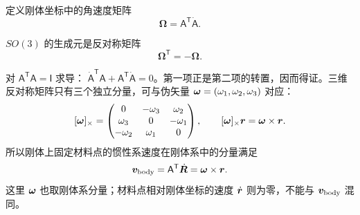 定义刚体坐标中的角速度矩阵
\begin{equation}\label{advA1:eq:omega-matrix}
 \bm{\Omega}=\mathsf{A}^{\mathsf T}\dot{\mathsf{A}}.
\end{equation}

\begin{advtheorem}{$SO(3)$ 的生成元是反对称矩阵}\label{advA1:thm:so3-generator}
\[
 \bm{\Omega}^{\mathsf T}=-\bm{\Omega}.
\]
\end{advtheorem}
对 $\mathsf A^{\mathsf T}\mathsf A=\mathsf I$ 求导：
$\dot{\mathsf A}^{\mathsf T}\mathsf A+\mathsf A^{\mathsf T}\dot{\mathsf A}=0$。第一项正是第二项的转置，因而得证。三维反对称矩阵只有三个独立分量，可与伪矢量 $\bm{\omega}=(\omega_1,\omega_2,\omega_3)$ 对应：
\[
 [\bm{\omega}]_\times=
 \begin{pmatrix}
 0&-\omega_3&\omega_2\\
 \omega_3&0&-\omega_1\\
 -\omega_2&\omega_1&0
 \end{pmatrix},
 \qquad [\bm{\omega}]_\times\bm{r}=\bm{\omega}\times\bm{r}.
\]
所以刚体上固定材料点的惯性系速度在刚体系中的分量满足
\[
 \bm{v}_{\rm body}=\mathsf A^{\mathsf T}\dot{\bm{R}}
 =\bm{\omega}\times\bm{r}.
\]
这里 $\bm{\omega}$ 也取刚体系分量；材料点相对刚体坐标的速度 $\dot{\bm{r}}$ 则为零，不能与 $\bm{v}_{\rm body}$ 混同。

